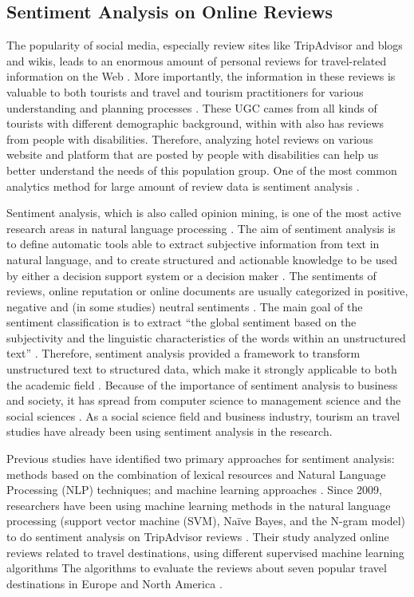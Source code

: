 \subsection{Sentiment Analysis on Online Reviews}
The popularity of social media, especially review sites like 
TripAdvisor and blogs and wikis, leads to an enormous amount of personal 
reviews for travel-related information on the Web \cite{opinion2014}. 
More importantly, the information in these reviews is valuable to both 
tourists and travel and tourism practitioners for various understanding 
and planning processes \cite{YE20096527}. These UGC cames from all kinds of 
tourists with different demographic background, within with also has reviews 
from people with disabilities. Therefore, analyzing hotel reviews on various 
website and platform that are posted by people with disabilities can help 
us better understand the needs of this population group. One of the most 
common analytics method for large amount of review data is sentiment analysis \cite{opinion2014}.

Sentiment analysis, which is also called opinion mining, is one of the most active
research areas in natural language processing \cite{opinion2014}. The aim of 
sentiment analysis is to define automatic tools able to extract subjective 
information from text in natural language, and to create 
structured and actionable knowledge to be used by either a decision support 
system or a decision maker \cite{article, YE20096527} . The sentiments of reviews, online reputation or 
online documents are usually categorized in positive, negative and (in some 
studies) neutral sentiments \cite{Garcia2012}. The main goal of the sentiment 
classification is to extract ``the global sentiment based on the subjectivity 
and the linguistic characteristics of the words within an unstructured text'' 
\cite{Garcia2012}. Therefore, sentiment analysis provided a framework to 
transform unstructured text to structured data, which make it strongly 
applicable to both the academic field \cite{Cam2013}. Because of the 
importance of sentiment analysis to business and society, it has spread 
from computer science to management science and the social sciences \cite{Pozzi}. 
As a social science field and business industry, tourism an travel studies 
have already been using sentiment analysis in the research.

Previous studies have identified two primary approaches for sentiment 
analysis: methods based on the combination of lexical resources and 
Natural Language Processing (NLP) techniques; and machine learning 
approaches \cite{Garcia2012}. Since 2009, researchers have been using 
machine learning methods in the natural language processing (support 
vector machine (SVM), Naïve Bayes, and the N-gram model) to do sentiment 
analysis on TripAdvisor reviews \cite{YE20096527}. 
Their study analyzed online reviews related to travel destinations, 
using different supervised machine learning algorithms The
algorithms to evaluate the reviews about seven popular travel destinations 
in Europe and North America \cite{YE20096527}.

